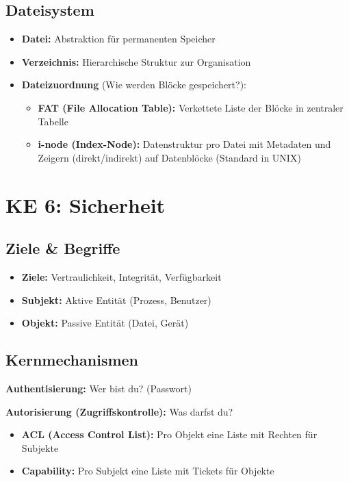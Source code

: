 \documentclass[9pt,a4paper]{extarticle}
\begin{document}
\begin{multicols*}{2}
\subsection{Dateisystem}
\begin{itemize}
\item \textbf{Datei:} Abstraktion für permanenten Speicher
\item \textbf{Verzeichnis:} Hierarchische Struktur zur Organisation
\item \textbf{Dateizuordnung} (Wie werden Blöcke gespeichert?):
  \begin{itemize}
  \item \textbf{FAT (File Allocation Table):} Verkettete Liste der Blöcke in zentraler Tabelle
  \item \textbf{i-node (Index-Node):} Datenstruktur pro Datei mit Metadaten und Zeigern (direkt/indirekt) auf Datenblöcke (Standard in UNIX)
  \end{itemize}
\end{itemize}

\section{KE 6: Sicherheit}

\subsection{Ziele \& Begriffe}
\begin{itemize}
\item \textbf{Ziele:} Vertraulichkeit, Integrität, Verfügbarkeit
\item \textbf{Subjekt:} Aktive Entität (Prozess, Benutzer)
\item \textbf{Objekt:} Passive Entität (Datei, Gerät)
\end{itemize}

\subsection{Kernmechanismen}
\textbf{Authentisierung:} Wer bist du? (Passwort)

\textbf{Autorisierung (Zugriffskontrolle):} Was darfst du?
\begin{itemize}
\item \textbf{ACL (Access Control List):} Pro Objekt eine Liste mit Rechten für Subjekte
\item \textbf{Capability:} Pro Subjekt eine Liste mit Tickets für Objekte
\end{itemize}


\end{multicols*}
\end{document}
